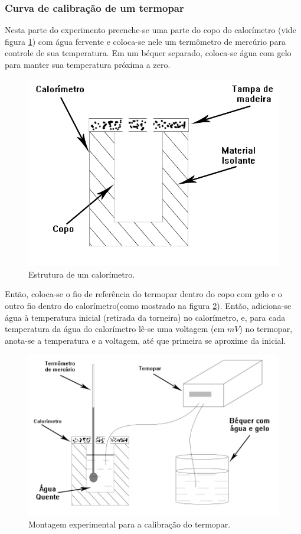 \documentclass[12pt,a4paper]{article}
\begin{document}
\subsubsection{Curva de calibração de um termopar}

  Nesta parte do experimento preenche-se uma parte do copo do calorímetro (vide figura \ref{calorimetro}) com água fervente e coloca-se nele um termômetro de mercúrio para controle de sua temperatura. Em um béquer separado, coloca-se água com gelo para manter sua temperatura próxima a zero.\\

\begin{figure}[!htbp]
\centering
\includegraphics[scale=0.3]{Fig6a1.jpg}
\caption{Estrutura de um calorímetro.}
\label{calorimetro}
\end{figure}

Então, coloca-se o fio de referência do termopar dentro do copo com gelo e o outro fio dentro do calorímetro(como mostrado na figura \ref{exptermopar}). Então, adiciona-se água à temperatura inicial (retirada da torneira) no calorímetro, e, para cada temperatura da água do calorímetro lê-se uma voltagem (em $mV$) no termopar, anota-se a temperatura e a voltagem, até que primeira se aproxime da inicial.

\begin{figure}[!htbp]
\centering
\includegraphics[scale=0.3]{Fig6a2.jpg}
\caption{Montagem experimental para a calibração do termopar.}
\label{exptermopar}
\end{figure}
\end{document}
